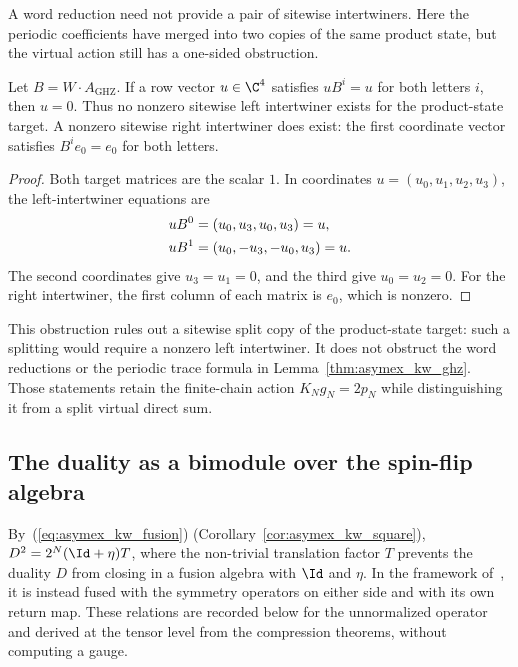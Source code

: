 A word reduction need not provide a pair of sitewise intertwiners.
Here the periodic coefficients have merged into two copies of the same
product state, but the virtual action still has a one-sided obstruction.

\begin{lemma}
    \label{thm:asymex_kw_ghz_intertwiner}
    \leanok
    Let $B=W\cdot A_{\mathrm{GHZ}}$. If a row vector $u\in\C^4$
    satisfies $uB^i=u$ for both letters $i$, then $u=0$.
    Thus no nonzero sitewise left intertwiner exists for the
    product-state target. A nonzero sitewise right intertwiner does
    exist: the first coordinate vector satisfies $B^ie_0=e_0$ for both
    letters.
\end{lemma}

\begin{proof}
    \leanok
    Both target matrices are the scalar $1$. In coordinates
    $u=(u_0,u_1,u_2,u_3)$, the left-intertwiner equations are
    \begin{align}
        uB^0 & =(u_0,u_3,u_0,u_3)=u,
        \notag                         \\
        uB^1 & =(u_0,-u_3,-u_0,u_3)=u.
        \notag
    \end{align}
    The second coordinates give $u_3=u_1=0$, and the third give
    $u_0=u_2=0$. For the right intertwiner, the first column of each
    matrix is $e_0$, which is nonzero.
\end{proof}

This obstruction rules out a sitewise split copy of the product-state
target: such a splitting would require a nonzero left intertwiner.
It does not obstruct the word reductions or the periodic trace formula
in Lemma~\ref{thm:asymex_kw_ghz}. Those statements retain the
finite-chain action $K_Ng_N=2p_N$ while distinguishing it from a split
virtual direct sum.

\subsection{The duality as a bimodule over the spin-flip algebra}%
\label{sec:asymex_kw_bimodule}

By~(\ref{eq:asymex_kw_fusion}) (Corollary~\ref{cor:asymex_kw_square}),
$D^2=2^N(\Id+\eta)T$, where the non-trivial translation factor $T$ prevents the
duality $D$ from closing in a fusion algebra with $\Id$ and $\eta$. In the
framework of~\cite{Aasen2016Topological}, it is instead fused with the symmetry
operators on either side and with its own return map.
These relations are recorded below for the unnormalized operator and derived at
the tensor level from the compression theorems, without computing a
gauge.


